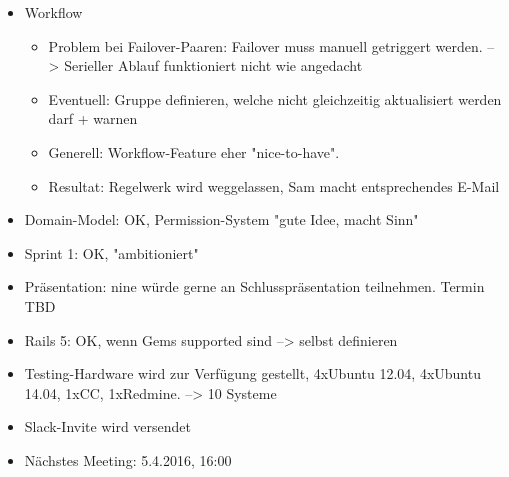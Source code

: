 \documentclass[class=scrbook,crop=false]{standalone}
\begin{document}
	\begin{itemize}
        \item Workflow
        \begin{itemize}
            \item Problem bei Failover-Paaren: Failover muss manuell getriggert werden. --> Serieller Ablauf funktioniert nicht wie angedacht
            \item Eventuell: Gruppe definieren, welche nicht gleichzeitig aktualisiert werden darf + warnen
            \item Generell: Workflow-Feature eher "nice-to-have".
            \item Resultat: Regelwerk wird weggelassen, Sam macht entsprechendes E-Mail
        \end{itemize}
        \item Domain-Model: OK, Permission-System "gute Idee, macht Sinn"
        \item Sprint 1: OK, "ambitioniert"
        \item Präsentation: \gls{nine} würde gerne an Schlusspräsentation teilnehmen. Termin TBD
        \item Rails 5: OK, wenn Gems supported sind --> selbst definieren
        \item Testing-Hardware wird zur Verfügung gestellt, 4xUbuntu 12.04, 4xUbuntu 14.04, 1xCC, 1xRedmine. --> 10 Systeme
        \item Slack-Invite wird versendet
        \item Nächstes Meeting: 5.4.2016, 16:00
    \end{itemize}
\end{document}
